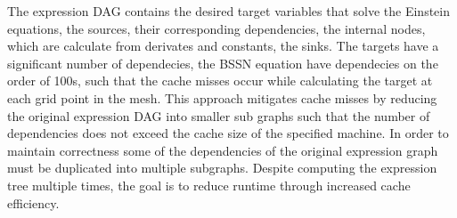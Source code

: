 \documentclass[landscape]{a0poster}
\begin{document}
\begin{textblock}{30}
\begin{textblock}{14}
	\vspace{-0.25in}
	The expression DAG contains the desired target variables that solve the Einstein equations, the sources, their corresponding dependencies, the internal nodes, which are calculate from derivates and constants, the sinks. The targets have a significant number of dependecies, the BSSN equation have dependecies on the order of 100s, such that the cache misses occur while calculating the target at each grid point in the mesh. This approach mitigates cache misses by reducing the original expression DAG into smaller sub graphs such that the number of dependencies does not exceed the cache size of the specified machine. In order to maintain correctness some of the dependencies of the original expression graph must be duplicated into multiple subgraphs. Despite computing the expression tree multiple times, the goal is to reduce runtime through increased cache efficiency.
	
\end{textblock}

\end{textblock}
\end{document}
